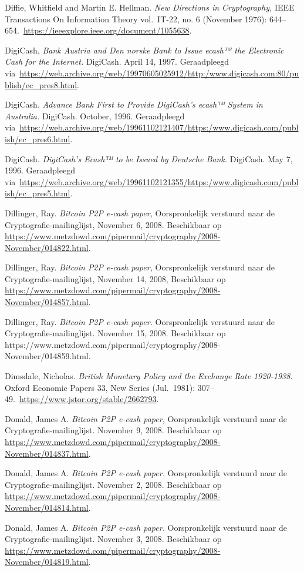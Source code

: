 \documentclass[
  a5paper,
  smalldemyvopaper,11pt,twoside,onecolumn,openright,extrafontsizes,
hidelinks]{memoir}
\begin{document}
Diffie, Whitfield and Martin E. Hellman. \emph{New Directions in
Cryptography,} IEEE Transactions On Information Theory vol.~IT-22, no. 6
(November 1976):
644--654.~\url{https://ieeexplore.ieee.org/document/1055638}.

DigiCash, \emph{Bank Austria and Den norske Bank to Issue ecash™ the
Electronic Cash for the Internet.} DigiCash. April 14, 1997.
Geraadpleegd
via~\url{https://web.archive.org/web/19970605025912/http:/www.digicash.com:80/publish/ec_pres8.html}.

DigiCash. \emph{Advance Bank First to Provide DigiCash's ecash™ System
in Australia.} DigiCash. October, 1996. Geraadpleegd
via~\url{https://web.archive.org/web/19961102121407/https:/www.digicash.com/publish/ec_pres6.html}.

DigiCash. \emph{DigiCash's Ecash™ to be Issued by Deutsche Bank.}
DigiCash. May 7, 1996. Geraadpleegd
via~\url{https://web.archive.org/web/19961102121355/https:/www.digicash.com/publish/ec_pres5.html}.

Dillinger, Ray. \emph{Bitcoin P2P e-cash paper,} Oorspronkelijk
verstuurd naar de Cryptografie-mailinglijst, November 6, 2008.
Beschikbaar op
\url{https://www.metzdowd.com/pipermail/cryptography/2008-November/014822.html}.

Dillinger, Ray. \emph{Bitcoin P2P e-cash paper,} Oorspronkelijk
verstuurd naar de Cryptografie-mailinglijst, November 14, 2008,
Beschikbaar op
\url{https://www.metzdowd.com/pipermail/cryptography/2008-November/014857.html}.

Dillinger, Ray. \emph{Bitcoin P2P e-cash paper.} Oorspronkelijk
verstuurd naar de Cryptografie-mailinglijst. November 15, 2008.
Beschikbaar op
https://www.metzdowd.com/pipermail/cryptography/2008-November/014859.html.

Dimsdale, Nicholas. \emph{British Monetary Policy and the Exchange Rate
1920-1938.} Oxford Economic Papers 33, New Series (Jul.~1981):
307--49.~\url{https://www.jstor.org/stable/2662793}.

Donald, James A. \emph{Bitcoin P2P e-cash paper,} Oorspronkelijk
verstuurd naar de Cryptografie-mailinglijst. November 9, 2008.
Beschikbaar op
\url{https://www.metzdowd.com/pipermail/cryptography/2008-November/014837.html}.

Donald, James A. \emph{Bitcoin P2P e-cash paper.} Oorspronkelijk
verstuurd naar de Cryptografie-mailinglijst. November 2, 2008.
Beschikbaar op
\url{https://www.metzdowd.com/pipermail/cryptography/2008-November/014814.html}.

Donald, James A. \emph{Bitcoin P2P e-cash paper.} Oorspronkelijk
verstuurd naar de Cryptografie-mailinglijst. November 3, 2008.
Beschikbaar op
\url{https://www.metzdowd.com/pipermail/cryptography/2008-November/014819.html}.
\end{document}
